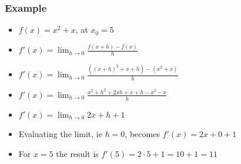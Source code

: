  \begin{frame}[fragile]\frametitle{Example}
\begin{itemize}
\item $f(x) = x^2 + x $, at $x_0 = 5$
\item $f'(x) = \lim_{h \to 0} \frac{f(x + h) - f(x)}{h}$
\item $f'(x) = \lim_{h \to 0} \frac{((x+h)^{2} + x + h) - (x^{2} + x)}{h}$
\item $f'(x) = \lim_{h \to 0} \frac{x^{2} + h^{2} + 2xh + x + h - x^{2} - x}{h}$
\item $f'(x) = \lim_{h \to 0} 2x + h + 1 $
\item Evaluating the limit, ie $h=0$, becomes $f'(x) = 2x + 0 + 1$
\item For $x = 5 $ the result is $f'(5) = 2\cdot5 + 1 = 10 + 1 = 11$
\end{itemize}
\end{frame}








